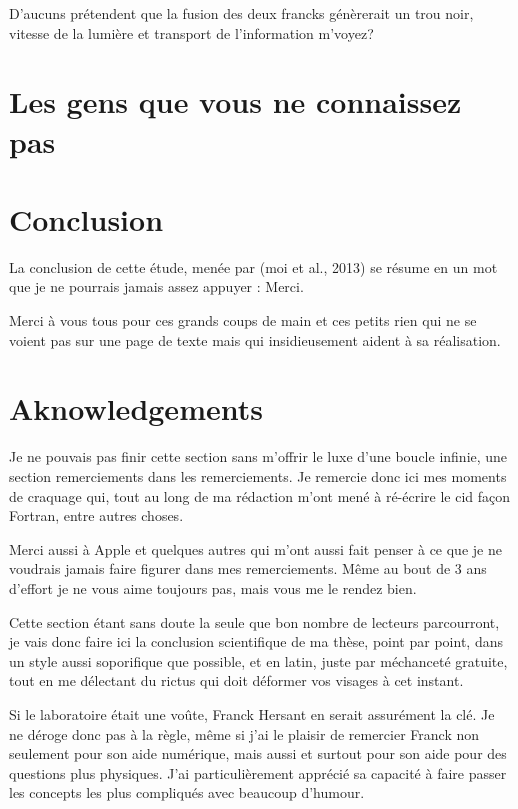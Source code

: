 D'aucuns prétendent que la fusion des deux francks génèrerait un trou noir, vitesse de la lumière et transport de l'information m'voyez?

\section{Les gens que vous ne connaissez pas}

\section{Conclusion}
La conclusion de cette étude, menée par (moi et al., 2013) se résume en un mot que je ne pourrais jamais assez appuyer : Merci. 

Merci à vous tous pour ces grands coups de main et ces petits rien qui ne se voient pas sur une page de texte mais qui insidieusement aident à sa réalisation.

\section{Aknowledgements}
Je ne pouvais pas finir cette section sans m'offrir le luxe d'une boucle infinie, une section remerciements dans les remerciements. Je remercie donc ici mes moments de craquage qui, tout au long de ma rédaction m'ont mené à ré-écrire le cid façon Fortran, entre autres choses. 

Merci aussi à Apple et quelques autres qui m'ont aussi fait penser à ce que je ne voudrais jamais faire figurer dans mes remerciements. Même au bout de 3 ans d'effort je ne vous aime toujours pas, mais vous me le rendez bien. 


Cette section étant sans doute la seule que bon nombre de lecteurs parcourront, je vais donc faire ici la conclusion scientifique de ma thèse, point par point, dans un style aussi soporifique que possible, et en latin, juste par méchanceté gratuite, tout en me délectant du rictus qui doit déformer vos visages à cet instant. 




Si le laboratoire était une voûte, Franck Hersant en serait assurément la clé. Je ne déroge donc pas à la règle, même si j'ai le plaisir de remercier Franck non seulement pour son aide numérique, mais aussi et surtout pour son aide pour des questions plus physiques. J'ai particulièrement apprécié sa capacité à faire passer les concepts les plus compliqués avec beaucoup d'humour.

